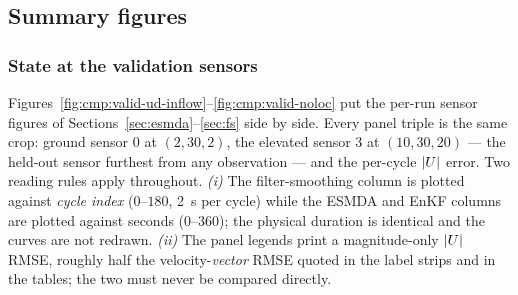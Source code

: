 \begin{table}[H]
  \centering
  \caption{Observation-interval sweeps, ESMDA versus filter smoothing
  (correlation localization throughout). Recall caveat~3 of
  \S\ref{sec:cmp:scope}: the same column heading denotes a change in the
  assimilated observation count for ESMDA but only a change in the smoother's
  aggregation bin for the hybrid. The sequential-filtering campaign has no
  such sweep.}
  \label{tab:cmp:obsinterval}
  \CmpObsIntervalTable
\end{table}

\begin{table}[H]
  \centering
  \caption{Cost. \emph{analyses} counts Kalman/MDA updates over the whole
  \SI{360}{\second} run; \emph{obs per analysis} is the number of scalar
  observations each update sees; \emph{window passes} is how many times the
  \SI{120}{\second} window is integrated by the full ensemble per assimilation
  window. Wall-time statistics are over all completed runs of that method
  (both truth models and all cases), so they mix solver speeds --- the
  periodic uDALES runs are intrinsically the fastest. The last column
  normalises by the joint-EnKF mean.}
  \label{tab:cmp:cost}
  \CmpCostTable
\end{table}

\subsection{Summary figures}
\label{sec:cmp:figures}

\subsubsection{State at the validation sensors}
\label{sec:cmp:fig-state}

Figures~\ref{fig:cmp:valid-ud-inflow}--\ref{fig:cmp:valid-noloc} put the
per-run sensor figures of Sections~\ref{sec:esmda}--\ref{sec:fs} side by side.
Every panel triple is the same crop: ground sensor $0$ at $(2,30,2)$, the
elevated sensor $3$ at $(10,30,20)$ --- the held-out sensor furthest from any
observation --- and the per-cycle $|U|$ error. Two reading rules apply
throughout. \emph{(i)} The filter-smoothing column is plotted against
\emph{cycle index} ($0$--$180$, \SI{2}{\second} per cycle) while the ESMDA and
EnKF columns are plotted against seconds ($0$--$360$); the physical duration is
identical and the curves are not redrawn. \emph{(ii)} The panel legends print a
magnitude-only $|U|$ RMSE, roughly half the velocity-\emph{vector} RMSE
quoted in the label strips and in the tables; the two must never be compared
directly.


